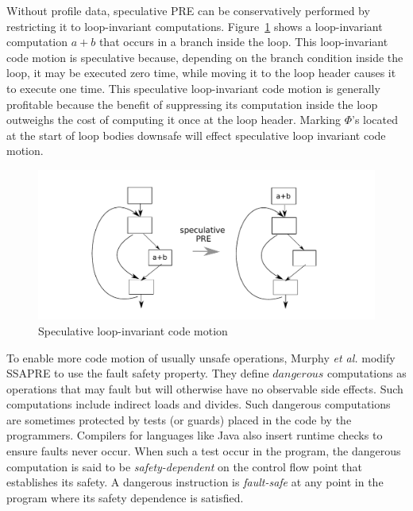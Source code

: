 Without profile data, speculative PRE can be conservatively performed by
restricting it to loop-invariant computations.  Figure~\ref{fig: spec-pre} shows
a loop-invariant computation $a+b$ that occurs in a branch inside the loop.
This loop-invariant code motion is speculative because, depending on the
branch condition inside the loop, it may be executed zero time, while moving it
to the loop header causes it to execute one time. This speculative 
loop-invariant code motion is generally profitable because the benefit of
suppressing its computation inside the loop outweighs the cost of computing it
once at the loop header.  Marking $\Phi$'s located at the start of loop bodies
downsafe will effect speculative loop invariant code motion\cite{Lo98}. 

\begin{figure}
\centering
\includegraphics[scale=0.55]{fig-spec-pre.pdf}
\caption{Speculative loop-invariant code motion}
\label{fig: spec-pre}
\end{figure}

To enable more code motion of usually unsafe operations, Murphy {\it et al.} 
modify SSAPRE to use the fault safety property.   They define $dangerous$
computations as operations that may fault but will otherwise have no observable
side effects.  Such computations include indirect loads and divides.  Such
dangerous computations are sometimes protected by tests (or guards) placed in
the code by the programmers.  Compilers for languages like Java also insert 
runtime checks to ensure faults never occur. When such a test occur in the
program, the dangerous computation is said to be \emph{safety-dependent} on
the control flow point that establishes its safety.  A dangerous instruction
is \emph{fault-safe} at any point in the program where its safety dependence
is satisfied.

